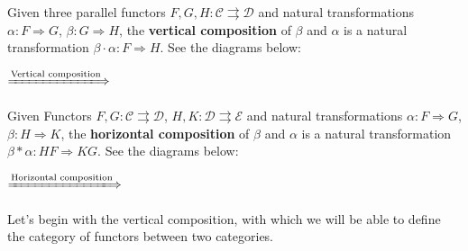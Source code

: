 	\begin{definition}
	Given three parallel functors $F,G,H:\mathcal{C}\rightrightarrows\mathcal{D}$ and natural transformations $\alpha:F\Rightarrow G$, $\beta:G\Rightarrow H$, the \textbf{vertical composition} of $\beta$ and $\alpha $ is a natural transformation $\beta\cdot \alpha:F\Rightarrow H$. See the diagrams below:
	\begin{center}
		$\xLongrightarrow{\text{Vertical composition}}$
	\end{center}
	Given Functors $F,G:\mathcal{C}\rightrightarrows\mathcal{D}$, $H,K:\mathcal{D}\rightrightarrows\mathcal{E}$ and natural transformations $\alpha:F\Rightarrow G$, $\beta:H\Rightarrow K$, the \textbf{horizontal composition} of $\beta$ and $\alpha$ is a natural transformation $\beta\ast\alpha:HF\Rightarrow KG$. See the diagrams below:
	\begin{center}
		$\xLongrightarrow{\text{Horizontal composition}}$
	\end{center}
	\end{definition}
	Let's begin with the vertical composition, with which we will be able to define the category of functors between two categories.
